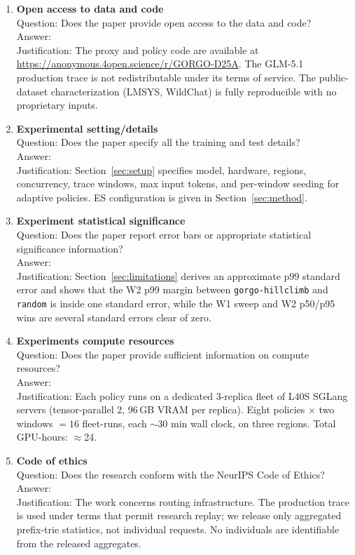 \documentclass{article}
\begin{document}
\begin{enumerate}
\item {\bf Open access to data and code}\\
Question: Does the paper provide open access to the data and code?\\
Answer: \answerYes{}\\
Justification: The proxy and policy code are available at \href{https://anonymous.4open.science/r/GORGO-D25A}{https://anonymous.4open.science/r/GORGO-D25A}. The GLM-5.1 production trace is not redistributable under its terms of service. The public-dataset characterization (LMSYS, WildChat) is fully reproducible with no proprietary inputs.

\item {\bf Experimental setting/details}\\
Question: Does the paper specify all the training and test details?\\
Answer: \answerYes{}\\
Justification: Section~\ref{sec:setup} specifies model, hardware, regions, concurrency, trace windows, max input tokens, and per-window seeding for adaptive policies. ES configuration is given in Section~\ref{sec:method}.

\item {\bf Experiment statistical significance}\\
Question: Does the paper report error bars or appropriate statistical significance information?\\
Answer: \answerYes{}\\
Justification: Section~\ref{sec:limitations} derives an approximate p99 standard error and shows that the W2 p99 margin between \texttt{gorgo-hillclimb} and \texttt{random} is inside one standard error, while the W1 sweep and W2 p50/p95 wins are several standard errors clear of zero.

\item {\bf Experiments compute resources}\\
Question: Does the paper provide sufficient information on compute resources?\\
Answer: \answerYes{}\\
Justification: Each policy runs on a dedicated 3-replica fleet of L40S SGLang servers (tensor-parallel 2, 96\,GB VRAM per replica). Eight policies $\times$ two windows $= 16$ fleet-runs, each $\sim$30 min wall clock, on three regions. Total GPU-hours: $\approx$24.

\item {\bf Code of ethics}\\
Question: Does the research conform with the NeurIPS Code of Ethics?\\
Answer: \answerYes{}\\
Justification: The work concerns routing infrastructure. The production trace is used under terms that permit research replay; we release only aggregated prefix-trie statistics, not individual requests. No individuals are identifiable from the released aggregates.


\end{enumerate}
\end{document}
